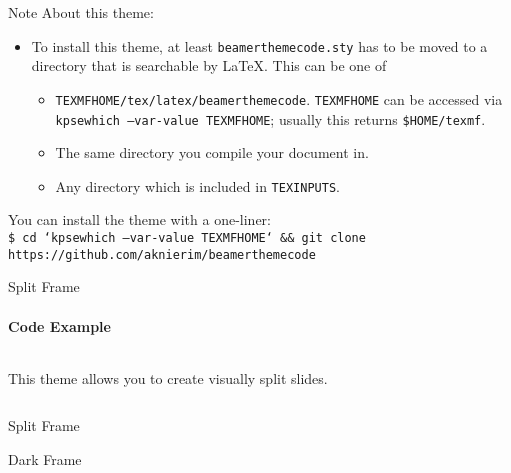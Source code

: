 \begin{frame}{Note}
  About this theme:
  \begin{itemize}
    \item To install this theme, at least \texttt{beamerthemecode.sty} has to be moved to a directory that is searchable by \LaTeX.
      This can be one of
      \begin{itemize}
        \item \texttt{TEXMFHOME/tex/latex/beamerthemecode}. \texttt{TEXMFHOME} can be accessed via \texttt{kpsewhich --var-value TEXMFHOME};
          usually this returns \texttt{\$HOME/texmf}.
        \item The same directory you compile your document in.
        \item Any directory which is included in \texttt{TEXINPUTS}.
      \end{itemize}
  \end{itemize}

  You can install the theme with a one-liner:\\
  \texttt{\footnotesize\$ cd `kpsewhich --var-value TEXMFHOME` \&\& git clone https://github.com/aknierim/beamerthemecode}
\end{frame}


\begin{frame}{Split Frame}
  \framesubtitle{Code Example}
  \begin{columns}[t]
    \begin{column}{0.58\textwidth}
      This theme allows you to create visually split slides.
    \end{column}
    \hfill
    \begin{column}{0.38\textwidth}

    \end{column}
  \end{columns}
\end{frame}

\begin{frame}[split=0.4]{Split Frame}

\end{frame}

\begin{frame}{Dark Frame}
\end{frame}
